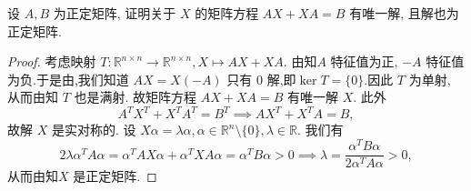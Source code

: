 \documentclass[../../main.tex]{subfiles}%
\begin{document}
\begin{example}
设 \( A,B \) 为正定矩阵, 证明关于 \( X \) 的矩阵方程 \( AX + XA = B \) 有唯一解, 且解也为正定矩阵.
\end{example}
\begin{proof}
考虑映射 \( T: \mathbb{R}^{n \times n} \to \mathbb{R}^{n \times n}, X \mapsto AX + XA \). 由知\( A \) 特征值为正, \( -A \) 特征值为负.于是由,我们知道 \( AX = X(-A) \) 只有 0 解,即$\ker T=\{0\}$.因此 \( T \) 为单射, 从而由知 \( T \) 也是满射. 故矩阵方程 \( AX + XA = B \) 有唯一解 \( X \). 此外
\[
A^T X^T + X^T A^T = B^T \implies AX^T + X^T A = B,
\]
故解 \( X \) 是实对称的. 设 \( X\alpha = \lambda\alpha, \alpha \in \mathbb{R}^n \setminus \{0\}, \lambda \in \mathbb{R} \). 我们有
\[
2\lambda\alpha^T A\alpha = \alpha^T AX\alpha + \alpha^T XA\alpha = \alpha^T B\alpha > 0 \implies \lambda = \frac{\alpha^T B\alpha}{2\alpha^T A\alpha} > 0,
\]
从而由知\( X \) 是正定矩阵.
\end{proof}
\end{document}
